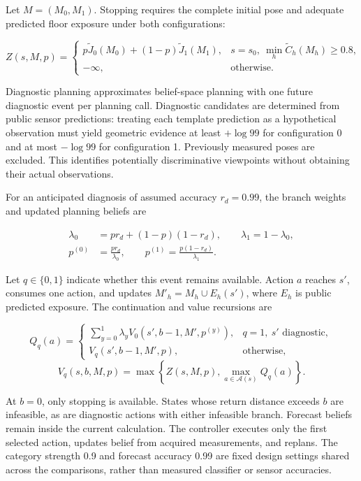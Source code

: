 Let \(M=(M_0,M_1)\). Stopping requires the complete initial pose and adequate predicted floor exposure under both configurations:

\[
Z(s,M,p)=
\begin{cases}
p\widetilde J_0(M_0)+(1-p)\widetilde J_1(M_1),
&s=s_0,\ \min_h\widetilde C_h(M_h)\ge0.8,\\
-\infty,&\text{otherwise}.
\end{cases}
\]

Diagnostic planning approximates belief-space planning \cite{ref12,ref13} with one future diagnostic event per planning call. Diagnostic candidates are determined from public sensor predictions: treating each template prediction as a hypothetical observation must yield geometric evidence at least \(+\log99\) for configuration 0 and at most \(-\log99\) for configuration 1. Previously measured poses are excluded. This identifies potentially discriminative viewpoints without obtaining their actual observations.

For an anticipated diagnosis of assumed accuracy \(r_d=0.99\), the branch weights and updated planning beliefs are

\[
\begin{aligned}
\lambda_0&=pr_d+(1-p)(1-r_d),\qquad \lambda_1=1-\lambda_0,\\
p^{(0)}&=\frac{pr_d}{\lambda_0},\qquad
p^{(1)}=\frac{p(1-r_d)}{\lambda_1}.
\end{aligned}
\]

Let \(q\in\{0,1\}\) indicate whether this event remains available. Action \(a\) reaches \(s'\), consumes one action, and updates \(M'_h=M_h\cup E_h(s')\), where \(E_h\) is public predicted exposure. The continuation and value recursions are

\[
Q_q(a)=
\begin{cases}
\sum_{y=0}^{1}\lambda_y V_0(s',b-1,M',p^{(y)}),
&q=1,\ s'\text{ diagnostic},\\
V_q(s',b-1,M',p),&\text{otherwise},
\end{cases}
\] \[
V_q(s,b,M,p)=\max\left\{Z(s,M,p),\max_{a\in\mathcal A(s)}Q_q(a)\right\}.
\]

At \(b=0\), only stopping is available. States whose return distance exceeds \(b\) are infeasible, as are diagnostic actions with either infeasible branch. Forecast beliefs remain inside the current calculation. The controller executes only the first selected action, updates belief from acquired measurements, and replans. The category strength 0.9 and forecast accuracy 0.99 are fixed design settings shared across the comparisons, rather than measured classifier or sensor accuracies.

